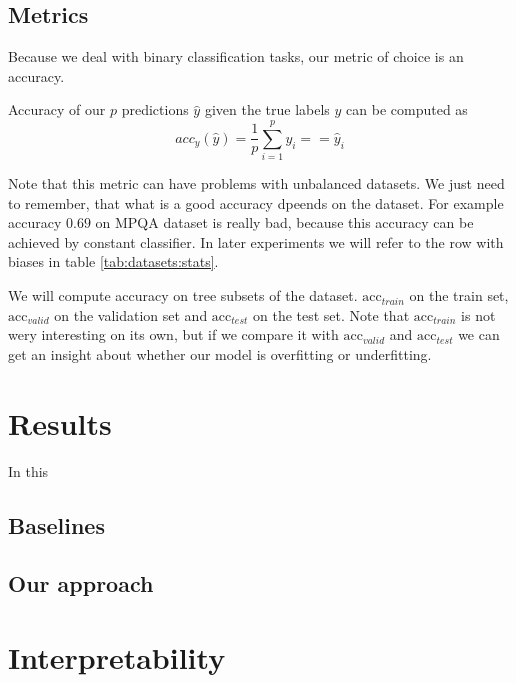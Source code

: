     \subsection{Metrics}
    
    Because we deal with binary classification tasks, our metric of choice is an accuracy.
    
    Accuracy of our $p$ predictions $\hat{y}$ given the true labels $y$ can be computed as
    $$acc_y(\hat{y}) = \frac{1}{p}\sum_{i=1}^py_i ==\hat{y}_i$$
    
    Note that this metric can have problems with unbalanced datasets. 
    We just need to remember, that what is a good accuracy dpeends on the dataset.
    For example accuracy $0.69$ on MPQA dataset is really bad, because this accuracy can be achieved by constant classifier.
    In later experiments we will refer to the row with biases in table \ref{tab:datasets:stats}.
    
    We will compute accuracy on tree subsets of the dataset. 
    $\mathrm{acc}_{train}$ on the train set, $\mathrm{acc}_{valid}$ on the validation set and $\mathrm{acc}_{test}$ on the test set.
    Note that $\mathrm{acc}_{train}$ is not wery interesting on its own, but if we compare it with $\mathrm{acc}_{valid}$ and $\mathrm{acc}_{test}$ we can get an insight about whether our model is overfitting or underfitting.

\section{Results}
    In this
    
    \subsection{Baselines}
    
    
    
    \subsection{Our approach}
    

\section{Interpretability}
    \cite{ribeiro2016should} %



